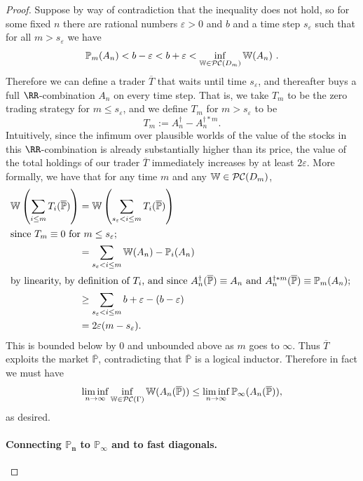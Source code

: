 \documentclass[authordate,onecolumn,noenvironments]{miri-tech-article}
\numberwithin{equation}{subsection}
\newcommand{\seq}[1]{{\overline{#1}}}
\newcommand{\mm}{m}
\newcommand{\nn}{n}
\newcommand{\li}{logical inductor}
\newcommand{\aff}{A}
\newcommand{\trade}{T}%
\newcommand{\Trader}{\seq{\trade}} %
\newcommand{\gens}{\dagger}
\newcommand{\BelState}{\mathbb{P}}
\newcommand{\pt}{\BelState}
\newcommand{\MP}{\seq{\pt}}
\newcommand{\dt}{D}
\newcommand{\pcworlds}{\mathcal{P\-C}}
\newcommand{\cworlds}{\mathcal{P\-C}} %
\newcommand{\World}{\mathbb{W}}
\newcommand{\Theory}{\Gamma}
\newcommand{\localportfoliovalue}{b}
\begin{document}
\begin{proof}
 Suppose by way of contradiction that the inequality does not hold, so for some fixed $n$ 
  there are  rational numbers $\varepsilon>0$ and $\localportfoliovalue$ and  a time step $s_\varepsilon$  such that for all $m> s_\varepsilon$ we have 
%  
  \[ \pt_{m}(\aff_{n})   <  \localportfoliovalue  -\varepsilon   <  \localportfoliovalue +\varepsilon
  < \inf_{\World\in\pcworlds(\dt_\mm)} \World(\aff_{\nn}) \ . \]
%
 Therefore we can define a trader $\Trader$ that waits
  until time $s_\varepsilon$, and thereafter buys a full 
$\RR$-combination $\aff_{n}$ on every time step. That is, we take $\trade_m$ to be the zero trading
  strategy for $m\le s_\varepsilon$, and we define $\trade_m$ for $m > s_\varepsilon$ to be 
  \[ \trade_m := \aff^\gens_n - \aff_n^{\gens* m} .  \]
  Intuitively, since the infimum over plausible worlds of the value of the stocks in this $\RR$-combination
  is already substantially higher than its price, the value of the  total holdings of our trader $\Trader$ immediately increases  by at least $2\varepsilon$. More formally, we have that for any time $m$ and any $\World\in\pcworlds(\dt_\mm)$, 
  \begin{align*}
    \World\left(\sum_{i\le m}\trade_i(\MP)\right) &=     \World\left(\sum_{s_\varepsilon < i\le m}\trade_i(\MP)\right)\\ 
   \shortintertext{since $\trade_m \equiv 0$ for $m \le s_\varepsilon$;}
    &= \sum_{s_\varepsilon < i\le m} \World(\aff_{\nn}) - \pt_{i}(\aff_{n}) \\ 
   \shortintertext{by linearity, by definition of $\trade_i$, and since $\aff^\gens_{\nn}(\MP) \equiv \aff_{\nn}$ and
   $\aff^{\gens * m}_{\nn}(\MP) \equiv \pt_m(\aff_{\nn})$; } 
    &\geq \sum_{s_\varepsilon < i\le m}  \localportfoliovalue  +\varepsilon -(\localportfoliovalue  -\varepsilon  )  \\ 
  &=  2\varepsilon (m-s_\varepsilon).
  \end{align*}
%
  This is bounded below by 0 and  unbounded above  as $m$ goes to $\infty$. Thus $\Trader$ exploits the market $\MP$, contradicting that $\MP$ is a \li{}. Therefore in fact we must have 
%
  \[ \liminf_{n \to \infty} \inf_{\World\in\cworlds(\Theory)} \World(\aff_{\nn}(\MP)) \le \liminf_{n \to \infty}  \pt_{\infty}(\aff_{n}(\MP)) , \]
%
as desired. 

\paragraph{Connecting  $\bm{\pt_n}$ to $\bm{\pt_\infty}$ and to fast diagonals.}


\end{proof}
\end{document}
